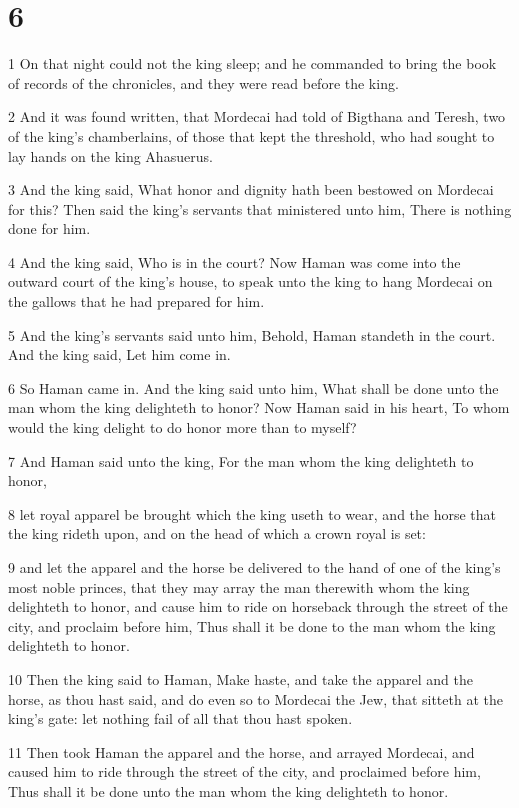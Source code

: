 \chapter{6}

\par 1 On that night could not the king sleep; and he commanded to bring the book of records of the chronicles, and they were read before the king.
\par 2 And it was found written, that Mordecai had told of Bigthana and Teresh, two of the king's chamberlains, of those that kept the threshold, who had sought to lay hands on the king Ahasuerus.
\par 3 And the king said, What honor and dignity hath been bestowed on Mordecai for this? Then said the king's servants that ministered unto him, There is nothing done for him.
\par 4 And the king said, Who is in the court? Now Haman was come into the outward court of the king's house, to speak unto the king to hang Mordecai on the gallows that he had prepared for him.
\par 5 And the king's servants said unto him, Behold, Haman standeth in the court. And the king said, Let him come in.
\par 6 So Haman came in. And the king said unto him, What shall be done unto the man whom the king delighteth to honor? Now Haman said in his heart, To whom would the king delight to do honor more than to myself?
\par 7 And Haman said unto the king, For the man whom the king delighteth to honor,
\par 8 let royal apparel be brought which the king useth to wear, and the horse that the king rideth upon, and on the head of which a crown royal is set:
\par 9 and let the apparel and the horse be delivered to the hand of one of the king's most noble princes, that they may array the man therewith whom the king delighteth to honor, and cause him to ride on horseback through the street of the city, and proclaim before him, Thus shall it be done to the man whom the king delighteth to honor.
\par 10 Then the king said to Haman, Make haste, and take the apparel and the horse, as thou hast said, and do even so to Mordecai the Jew, that sitteth at the king's gate: let nothing fail of all that thou hast spoken.
\par 11 Then took Haman the apparel and the horse, and arrayed Mordecai, and caused him to ride through the street of the city, and proclaimed before him, Thus shall it be done unto the man whom the king delighteth to honor.
